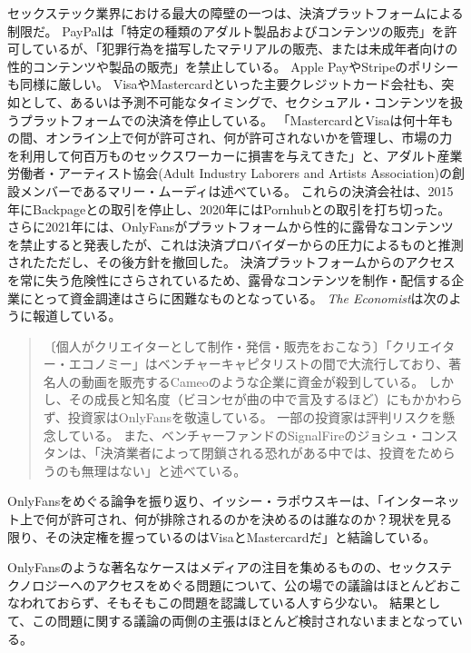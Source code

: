 \documentclass[paper=a4,book,openany]{jlreq} \usepackage{mystyle}
\begin{document}
セックステック業界における最大の障壁の一つは、決済プラットフォームによる制限だ。
PayPalは「特定の種類のアダルト製品およびコンテンツの販売」を許可しているが、「犯罪行為を描写したマテリアルの販売、または未成年者向けの性的コンテンツや製品の販売」を禁止している\citep{fearnow20:_porn_indus_stars_turn_crypt}。
Apple PayやStripeのポリシーも同様に厳しい。
VisaやMastercardといった主要クレジットカード会社も、突如として、あるいは予測不可能なタイミングで、セクシュアル・コンテンツを扱うプラットフォームでの決済を停止している。
「MastercardとVisaは何十年もの間、オンライン上で何が許可され、何が許可されないかを管理し、市場の力を利用して何百万ものセックスワーカーに損害を与えてきた」と、アダルト産業労働者・アーティスト協会(Adult Industry Laborers and Artists Association)の創設メンバーであるマリー・ムーディは述べている\citep{cole21:_i_felt_betray}。
これらの決済会社は、2015年にBackpageとの取引を停止し、2020年にはPornhubとの取引を打ち切った。
さらに2021年には、OnlyFansがプラットフォームから性的に露骨なコンテンツを禁止すると発表したが、これは決済プロバイダーからの圧力によるものと推測された{\DDASH}ただし、その後方針を撤回した。
決済プラットフォームからのアクセスを常に失う危険性にさらされているため、露骨なコンテンツを制作・配信する企業にとって資金調達はさらに困難なものとなっている\citep{sesta18:_platf_which_discr_sex_worker}。
\emph{The Economist}は次のように報道している。

\begin{quote}
〔個人がクリエイターとして制作・発信・販売をおこなう〕「クリエイター・エコノミー」はベンチャーキャピタリストの間で大流行しており、著名人の動画を販売するCameoのような企業に資金が殺到している。
しかし、その成長と知名度（ビヨンセが曲の中で言及するほど）にもかかわらず、投資家はOnlyFansを敬遠している。
一部の投資家は評判リスクを懸念している。
また、ベンチャーファンドのSignalFireのジョシュ・コンスタンは、「決済業者によって閉鎖される恐れがある中では、投資をためらうのも無理はない」と述べている。
\citep{economist21:_onlyf_u_turns_its_porn_ban}
\end{quote}

OnlyFansをめぐる論争を振り返り、イッシー・ラポウスキーは、「インターネット上で何が許可され、何が排除されるのかを決めるのは誰なのか？現状を見る限り、その決定権を握っているのはVisaとMastercardだ」と結論している\citep{lapowsky21:_onlyf_shows_visa_master_are}。

OnlyFansのような著名なケースはメディアの注目を集めるものの、セックステクノロジーへのアクセスをめぐる問題について、公の場での議論はほとんどおこなわれておらず、そもそもこの問題を認識している人すら少ない。
結果として、この問題に関する議論の両側の主張はほとんど検討されないままとなっている。
\end{document}
